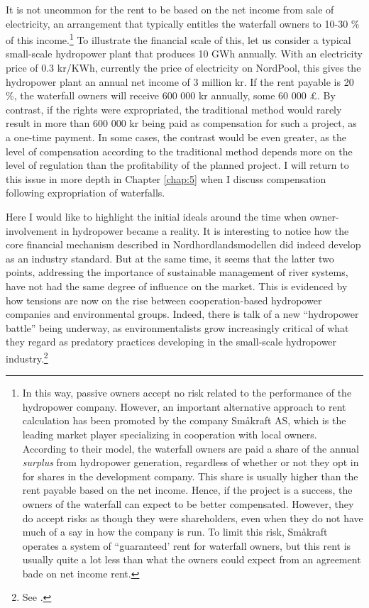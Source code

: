 It is not uncommon for the rent to be based on the net income from sale of electricity, an arrangement that typically entitles the waterfall owners to 10-30 \% of this income.\footnote{In this way, passive owners accept no risk related to the performance of the hydropower company. However, an important alternative approach to rent calculation has been promoted by the company Småkraft AS, which is the leading market player specializing in cooperation with local owners. According to their model, the waterfall owners are paid a share of the annual {\it surplus} from hydropower generation, regardless of whether or not they opt in for shares in the development company. This share is usually higher than the rent payable based on the net income. Hence, if the project is a success, the owners of the waterfall can expect to be better compensated. However, they do accept risks as though they were shareholders, even when they do not have much of a say in how the company is run. To limit this risk, Småkraft operates a system of ``guaranteed' rent for waterfall owners, but this rent is usually quite a lot less than what the owners could expect from an agreement bade on net income rent.}
To illustrate the financial scale of this, let us consider a typical small-scale hydropower plant that produces 10 GWh annually. With an electricity price of 0.3 kr/KWh, currently the price of electricity on NordPool, this gives the hydropower plant an annual net income of 3 million kr. If the rent payable is 20 \%, the waterfall owners will receive 600 000 kr annually, some 60 000 £. By contrast, if the rights were expropriated, the traditional method would rarely result in more than 600 000 kr being paid as compensation for such a project, as a one-time payment. In some cases, the contrast would be even greater, as the level of compensation according to the traditional method depends more on the level of regulation than the profitability of the planned project. I will return to this issue in more depth in Chapter \ref{chap:5} when I discuss compensation following expropriation of waterfalls.

Here I would like to highlight the initial ideals around the time when owner-involvement in hydropower became a reality. It is interesting to notice how the core financial mechanism described in Nordhordlandsmodellen did indeed develop as an industry standard. But at the same time, it seems that the latter two points, addressing the importance of sustainable management of river systems, have not had the same degree of influence on the market. This is evidenced by how tensions are now on the rise between cooperation-based hydropower companies and environmental groups. Indeed, there is talk of a new ``hydropower battle'' being underway, as environmentalists grow increasingly critical of what they regard as predatory practices developing in the small-scale hydropower industry.\footnote{See \cite{haltbrekken12}.}

